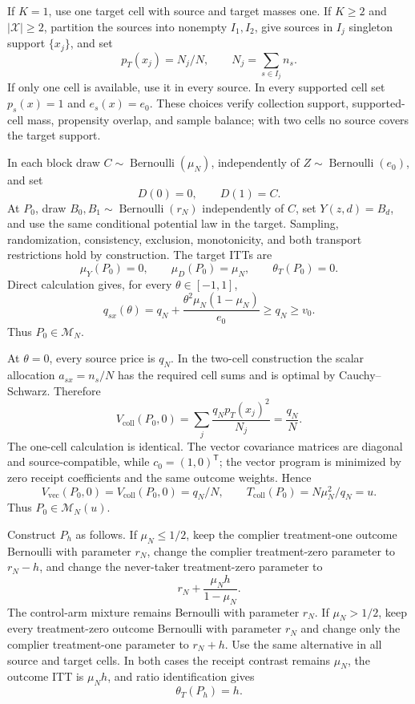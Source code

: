 If \(K=1\), use one target cell with source and target masses one. If \(K\ge2\) and \(|\mathcal X|\ge2\), partition the sources into nonempty \(I_1,I_2\), give sources in \(I_j\) singleton support \(\{x_j\}\), and set
\[
p_T(x_j)=N_j/N,\qquad N_j=\sum_{s\in I_j}n_s.
\]
If only one cell is available, use it in every source. In every supported cell set \(p_s(x)=1\) and \(e_s(x)=e_0\). These choices verify collection support, supported-cell mass, propensity overlap, and sample balance; with two cells no source covers the target support.

In each block draw \(C\sim\operatorname{Bernoulli}(\mu_N)\), independently of \(Z\sim\operatorname{Bernoulli}(e_0)\), and set
\[
D(0)=0,\qquad D(1)=C.
\]
At \(P_0\), draw \(B_0,B_1\sim\operatorname{Bernoulli}(r_N)\) independently of \(C\), set \(Y(z,d)=B_d\), and use the same conditional potential law in the target. Sampling, randomization, consistency, exclusion, monotonicity, and both transport restrictions hold by construction. The target ITTs are
\[
\mu_Y(P_0)=0,\qquad \mu_D(P_0)=\mu_N,\qquad\theta_T(P_0)=0.
\]
Direct calculation gives, for every \(\theta\in[-1,1]\),
\[
q_{sx}(\theta)=q_N+\frac{\theta^2\mu_N(1-\mu_N)}{e_0}\ge q_N\ge v_0.
\]
Thus \(P_0\in\mathcal M_N\).

At \(\theta=0\), every source price is \(q_N\). In the two-cell construction the scalar allocation \(a_{sx}=n_s/N\) has the required cell sums and is optimal by Cauchy--Schwarz. Therefore
\[
V_{\mathrm{coll}}(P_0,0)
=\sum_j\frac{q_Np_T(x_j)^2}{N_j}
=\frac{q_N}{N}.
\]
The one-cell calculation is identical. The vector covariance matrices are diagonal and source-compatible, while \(c_0=(1,0)^{\mathsf T}\); the vector program is minimized by zero receipt coefficients and the same outcome weights. Hence
\[
V_{\mathrm{vec}}(P_0,0)=V_{\mathrm{coll}}(P_0,0)=q_N/N,
\qquad
T_{\mathrm{coll}}(P_0)=N\mu_N^2/q_N=u.
\]
Thus \(P_0\in\mathcal M_N(u)\).

Construct \(P_h\) as follows. If \(\mu_N\le1/2\), keep the complier treatment-one outcome Bernoulli with parameter \(r_N\), change the complier treatment-zero parameter to \(r_N-h\), and change the never-taker treatment-zero parameter to
\[
r_N+\frac{\mu_Nh}{1-\mu_N}.
\]
The control-arm mixture remains Bernoulli with parameter \(r_N\). If \(\mu_N>1/2\), keep every treatment-zero outcome Bernoulli with parameter \(r_N\) and change only the complier treatment-one parameter to \(r_N+h\). Use the same alternative in all source and target cells. In both cases the receipt contrast remains \(\mu_N\), the outcome ITT is \(\mu_Nh\), and ratio identification gives
\[
\theta_T(P_h)=h.
\]

